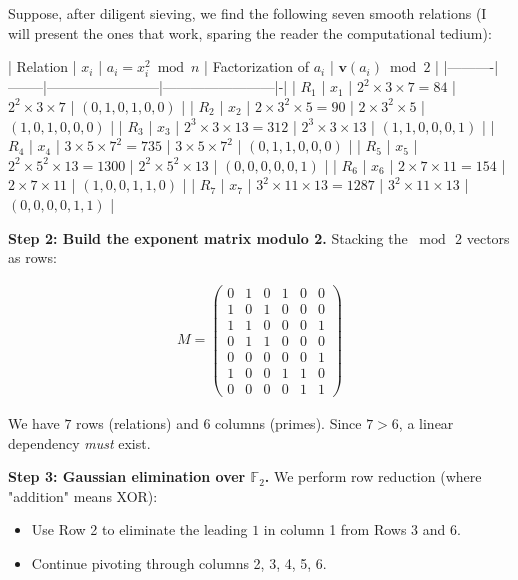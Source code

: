\documentclass[11pt,twoside,openright]{book}
\theoremstyle{definition}
\theoremstyle{remark}
\begin{document}
Suppose, after diligent sieving, we find the following seven smooth relations (I will present the ones that work, sparing the reader the computational tedium):

| Relation | $x_i$ | $a_i = x_i^2 \bmod n$ | Factorization of $a_i$ | $\mathbf{v}(a_i) \bmod 2$ |
|----------|--------|------------------------|------------------------|-|
| $R_1$ | $x_1$ | $2^2 \times 3 \times 7 = 84$ | $2^2 \times 3 \times 7$ | $(0, 1, 0, 1, 0, 0)$ |
| $R_2$ | $x_2$ | $2 \times 3^2 \times 5 = 90$ | $2 \times 3^2 \times 5$ | $(1, 0, 1, 0, 0, 0)$ |
| $R_3$ | $x_3$ | $2^3 \times 3 \times 13 = 312$ | $2^3 \times 3 \times 13$ | $(1, 1, 0, 0, 0, 1)$ |
| $R_4$ | $x_4$ | $3 \times 5 \times 7^2 = 735$ | $3 \times 5 \times 7^2$ | $(0, 1, 1, 0, 0, 0)$ |
| $R_5$ | $x_5$ | $2^2 \times 5^2 \times 13 = 1300$ | $2^2 \times 5^2 \times 13$ | $(0, 0, 0, 0, 0, 1)$ |
| $R_6$ | $x_6$ | $2 \times 7 \times 11 = 154$ | $2 \times 7 \times 11$ | $(1, 0, 0, 1, 1, 0)$ |
| $R_7$ | $x_7$ | $3^2 \times 11 \times 13 = 1287$ | $3^2 \times 11 \times 13$ | $(0, 0, 0, 0, 1, 1)$ |

\textbf{Step 2: Build the exponent matrix modulo 2.} Stacking the $\bmod\, 2$ vectors as rows:

\begin{align*}
M = \begin{pmatrix} 0 & 1 & 0 & 1 & 0 & 0 \\ 1 & 0 & 1 & 0 & 0 & 0 \\ 1 & 1 & 0 & 0 & 0 & 1 \\ 0 & 1 & 1 & 0 & 0 & 0 \\ 0 & 0 & 0 & 0 & 0 & 1 \\ 1 & 0 & 0 & 1 & 1 & 0 \\ 0 & 0 & 0 & 0 & 1 & 1 \end{pmatrix}
\end{align*}

We have $7$ rows (relations) and $6$ columns (primes). Since $7 > 6$, a linear dependency \textit{must} exist.

\textbf{Step 3: Gaussian elimination over $\mathbb{F}_2$.} We perform row reduction (where "addition" means XOR):

\begin{itemize}
  \item Use Row 2 to eliminate the leading $1$ in column 1 from Rows 3 and 6.
  \item Continue pivoting through columns 2, 3, 4, 5, 6.
\end{itemize}
\end{document}
